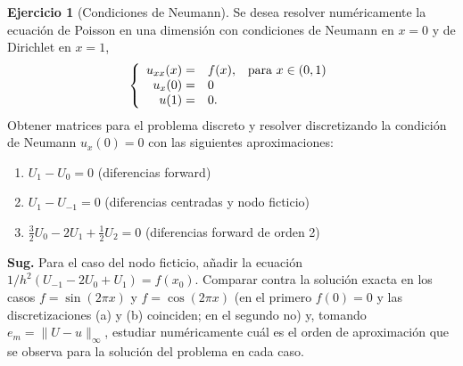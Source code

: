 \documentclass[12pt, a4paper]{amsbook}
\theoremstyle{remark}
\theoremstyle{definition}
\newtheorem{ejer}[teo]{Ejercicio}
\numberwithin{section}{chapter}
\numberwithin{subsection}{section}
\numberwithin{equation}{section}
\numberwithin{figure}{chapter}
\begin{document}
\begin{ejer}[Condiciones de Neumann] Se desea resolver numéricamente la ecuación de Poisson en una
dimensión con condiciones de Neumann en $x=0$ y de Dirichlet en $x=1$,
\begin{equation}
\label{laplaciano_neumann}
\left\lbrace
  \begin{array}{r l r}
      u_{xx}(x) = & f(x), & \mbox{para } x \in (0,1) \\
      u_x(0) = & 0 & \\
      u(1) = & 0. &
      \end{array}
    \right.
\end{equation}
Obtener matrices para el problema discreto y resolver discretizando la condición de Neumann $u_x(0)=0$ con las siguientes aproximaciones:
\begin{enumerate}[label=(\alph*)]
 \item $U_1 - U_0 = 0$ (diferencias forward)
 \item $U_1 - U_{-1} = 0$ (diferencias centradas y nodo ficticio)
 \item $\frac{3}{2}U_0 - 2U_1 + \frac{1}{2}U_2 = 0$ (diferencias forward de orden 2)
 \end{enumerate}
 \textbf{Sug.} Para el caso del nodo ficticio, añadir la ecuación $1/h^2\left(U_{-1} -2U_0 + U_{1}\right) = f(x_0)$.
 Comparar contra la solución exacta en los casos $f=\sin(2\pi x)$ y $f=\cos(2\pi x)$ (en el primero $f(0)=0$ y las discretizaciones (a) y (b) coinciden; en el segundo no) y, tomando $e_m = \| U - u \|_\infty$,
 estudiar numéricamente cuál es el orden de aproximación que se observa para la solución del problema en cada caso.
\end{ejer}
\end{document}
